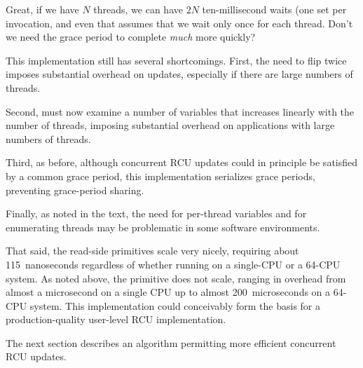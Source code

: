 \QuickQuiz{}
	Great, if we have $N$ threads, we can have $2N$ ten-millisecond
	waits (one set per  invocation,
	and even that assumes that we wait only once for each thread.
	Don't we need the grace period to complete \emph{much} more quickly?
 \QuickQuizEnd

This implementation still has several shortcomings.
First, the need to flip  twice imposes substantial overhead
on updates, especially if there are large numbers of threads.

Second,  must now examine a number of variables
that increases linearly with the number of threads, imposing substantial
overhead on applications with large numbers of threads.

Third, as before, although concurrent RCU updates could in principle
be satisfied by a common grace period, this implementation serializes
grace periods, preventing grace-period sharing.

Finally, as noted in the text, the need for per-thread variables
and for enumerating threads may be problematic in some software
environments.

That said, the read-side primitives scale very nicely, requiring about
115~nanoseconds regardless of whether running on a single-CPU or a 64-CPU
 system.
As noted above, the  primitive does not scale,
ranging in overhead from almost a microsecond on a single  CPU
up to almost 200~microseconds on a 64-CPU system.
This implementation could conceivably form the basis for a
production-quality user-level RCU implementation.

The next section describes an algorithm permitting more efficient
concurrent RCU updates.

